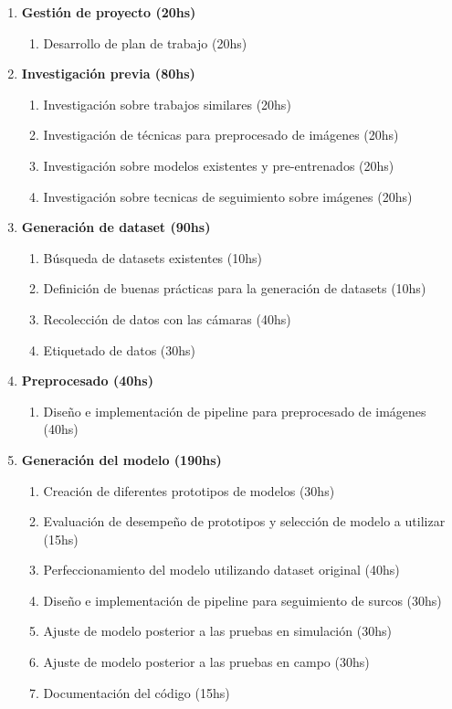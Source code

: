 \documentclass[
11pt, %
]{charter}
\begin{document}
\begin{enumerate}
	\item \textbf{Gestión de proyecto (20hs)}
	\begin{enumerate}
		\item Desarrollo de plan de trabajo (20hs)
	\end{enumerate}

\item \textbf{Investigación previa (80hs)}
	\begin{enumerate}
		\item Investigación sobre trabajos similares (20hs)
		\item Investigación de técnicas para preprocesado de imágenes (20hs)
		\item Investigación sobre modelos existentes y pre-entrenados (20hs)
		\item Investigación sobre tecnicas de seguimiento sobre imágenes (20hs)
	\end{enumerate}

\item \textbf{Generación de dataset (90hs)}
	\begin{enumerate}
		\item Búsqueda de datasets existentes (10hs)
		\item Definición de buenas prácticas para la generación de datasets (10hs)
		\item Recolección de datos con las cámaras (40hs)
		\item Etiquetado de datos (30hs)
	\end{enumerate}

\item \textbf{Preprocesado (40hs)}
	\begin{enumerate}
		\item Diseño e implementación de pipeline para preprocesado de imágenes (40hs)
	\end{enumerate}

\item \textbf{Generación del modelo (190hs)}
	\begin{enumerate}
		\item Creación de diferentes prototipos de modelos (30hs)
		\item Evaluación de desempeño de prototipos y selección de modelo a utilizar (15hs)
		\item Perfeccionamiento del modelo utilizando dataset original (40hs)
		\item Diseño e implementación de pipeline para seguimiento de surcos (30hs)
		\item Ajuste de modelo posterior a las pruebas en simulación (30hs)
		\item Ajuste de modelo posterior a las pruebas en campo (30hs)
		\item Documentación del código (15hs)
	\end{enumerate}


\end{enumerate}
\end{document}

